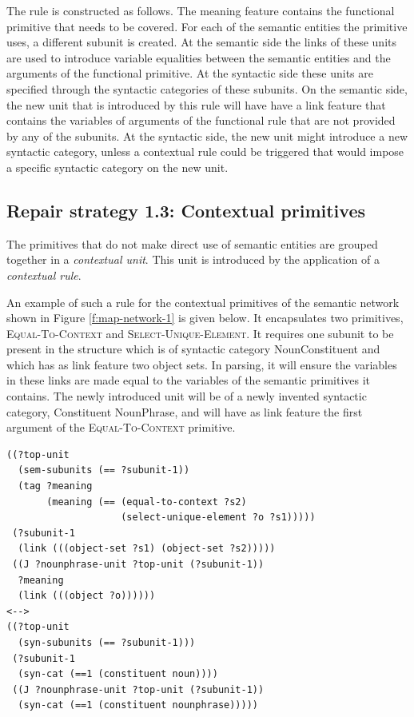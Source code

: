 The rule is constructed as follows. The meaning feature contains the
functional primitive that needs to be covered. For each of the
semantic entities the primitive uses, a different subunit is
created. At the semantic side the links of these units are used to
introduce variable equalities between the semantic entities and the
arguments of the functional primitive. At the syntactic side these
units are specified through the syntactic categories of these
subunits.  On the semantic side, the new unit that is introduced by
this rule will have have a link feature that contains the variables of
arguments of the functional rule that are not provided by any of the
subunits. At the syntactic side, the new unit might introduce a new
syntactic category, unless a contextual rule could be triggered that
would impose a specific syntactic category on the new unit.

\subsection{Repair strategy 1.3: Contextual primitives}

The primitives that do not make direct use of semantic entities are
grouped together in a \emph{contextual unit}. This unit is introduced
by the application of a \emph{contextual rule}. 

An example of such a rule for the contextual primitives of the
semantic network shown in Figure \ref{f:map-network-1} is given
below. It encapsulates two primitives, \textsc{Equal-To-Context} and
\textsc{Select-Unique-Element}. It requires one subunit to be present
in the structure which is of syntactic category NounConstituent and
which has as link feature two object sets. In parsing, it will ensure
the variables in these links are made equal to the variables of the
semantic primitives it contains. The newly introduced unit will be of
a newly invented syntactic category, Constituent NounPhrase, and will
have as link feature the first argument of the
\textsc{Equal-To-Context} primitive.

\footnotesize
\begin{Verbatim}[frame=lines, label=Contextual NounPhrase rule]
((?top-unit
  (sem-subunits (== ?subunit-1))
  (tag ?meaning
       (meaning (== (equal-to-context ?s2) 
                    (select-unique-element ?o ?s1)))))
 (?subunit-1 
  (link (((object-set ?s1) (object-set ?s2)))))
 ((J ?nounphrase-unit ?top-unit (?subunit-1))
  ?meaning
  (link (((object ?o))))))
<-->
((?top-unit 
  (syn-subunits (== ?subunit-1)))
 (?subunit-1 
  (syn-cat (==1 (constituent noun))))
 ((J ?nounphrase-unit ?top-unit (?subunit-1))
  (syn-cat (==1 (constituent nounphrase)))))
\end{Verbatim}
\normalsize

